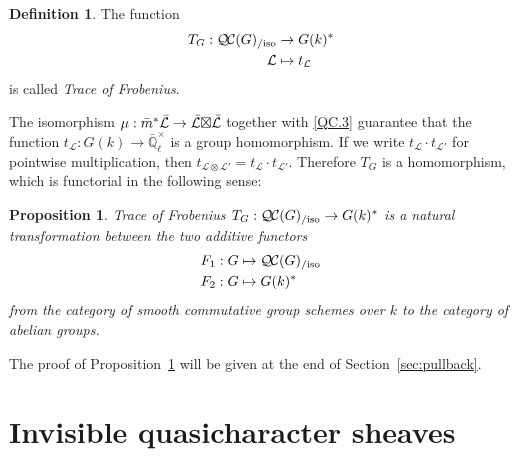 \documentclass{amsart}
\theoremstyle{plain}
\newtheorem{proposition}[theorem]{Proposition}
\theoremstyle{definition}
\newtheorem{definition}[theorem]{Definition}
\theoremstyle{remark}
\newcommand{\EE}{\mathbb{\bar Q}_\ell}
\newcommand{\Fq}{k}
\newcommand{\EEx}{\EE^\times}
\newcommand{\qcs}[1]{{\mathcal{#1}}}
\newcommand{\gqcs}[1]{{\mathcal{\bar #1}}}
\newcommand{\QC}{{\mathcal{Q\hskip-0.8pt C}}}
\newcommand{\QCiso}[1]{\QC(#1)_{/\text{iso}}}
\newcommand{\trFrob}[1]{t_{#1}}
\newcommand{\TrFrob}[1]{T_{#1}}
\newcommand{\bm}{\bar{m}}
\newcommand{\tight}[3]{\hspace{-#1pt}{#2}\hspace{-#3pt}}
\newcommand{\LxL}{\text{$\gqcs{L} \tight{0}{\boxtimes}{0} \gqcs{L}$}}
\begin{document}
\begin{definition}\label{def:trFrob}
The function
\begin{align*}
\TrFrob{G}: \QCiso{G} &\to G(\Fq)^* \\
\qcs{L} &\mapsto t_{\qcs{L}}
\end{align*}
is called \emph{Trace of Frobenius}.
\end{definition}

The isomorphism $\mu : \bm^* \gqcs{L} \to \LxL$ together with
\ref{QC.3} guarantee
that the function $\trFrob{\qcs{L}} : G(\Fq)\to \EEx$ is a group homomorphism.  If we write
$\trFrob{\qcs{L}} \cdot \trFrob{\qcs{L'}}$ for pointwise multiplication, then
 $\trFrob{\qcs{L}\otimes \qcs{L'}} = \trFrob{\qcs{L}} \cdot \trFrob{\qcs{L'}}$.
 Therefore $\TrFrob{G}$ is a homomorphism, which is functorial in the following sense:

\begin{proposition}\label{prop:functorialG}
Trace of Frobenius $\TrFrob{G} : \QCiso{G} \to G(\Fq)^*$ is a natural transformation
between the two additive functors
\begin{align*}
F_1 : G &\mapsto \QCiso{G} \\
F_2 : G &\mapsto G(\Fq)^*
\end{align*}
from the category of smooth commutative group schemes over $\Fq$ to the category of abelian groups.
\end{proposition}

The proof of Proposition~\ref{prop:functorialG} will be given at the end of Section~\ref{sec:pullback}.


\section{Invisible quasicharacter sheaves}\label{sec:invisible}
\end{document}
